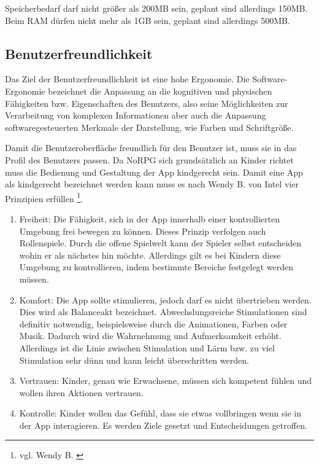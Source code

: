 		Speicherbedarf darf nicht größer als 200MB sein, geplant sind allerdings 150MB. Beim RAM dürfen nicht mehr als 1GB sein, geplant sind allerdings 500MB.
	
	\subsection{Benutzerfreundlichkeit}
		Das Ziel der Benutzerfreundlichkeit ist eine hohe Ergonomie. Die Software-Ergonomie bezeichnet die Anpassung an die kognitiven und physischen Fähigkeiten bzw. Eigenschaften des Benutzers, also seine Möglichkeiten zur Verarbeitung von komplexen Informationen aber auch die Anpassung softwaregesteuerten Merkmale der Darstellung, wie Farben und Schriftgröße.
		
		Damit die Benutzeroberfläche freundlich für den Benutzer ist, muss sie in das Profil des Benutzers passen. Da NoRPG sich grundsätzlich an Kinder richtet muss die Bedienung und Gestaltung der App kindgerecht sein. Damit eine App als kindgerecht bezeichnet werden kann muss es nach Wendy B. von Intel vier Prinzipien erfüllen \footnote{vgl. Wendy B. \cite{intelKids}}.
		
		\begin{enumerate}
			\item{Freiheit: Die Fähigkeit, sich in der App innerhalb einer kontrollierten Umgebung frei bewegen zu können. Dieses Prinzip verfolgen auch Rollenspiele. Durch die offene Spielwelt kann der Spieler selbst entscheiden wohin er als nächstes hin möchte. Allerdings gilt es bei Kindern diese Umgebung zu kontrollieren, indem bestimmte Bereiche festgelegt werden müssen.}
			\item{Komfort: Die App sollte stimulieren, jedoch darf es nicht übertrieben werden. Dies wird als Balanceakt bezeichnet. Abwechslungsreiche Stimulationen sind definitiv notwendig, beispielsweise durch die Animationen, Farben oder Musik. Dadurch wird die Wahrnehmung und Aufmerksamkeit erhöht. Allerdings ist die Linie zwischen Stimulation und Lärm bzw. zu viel Stimulation sehr dünn und kann leicht überschritten werden.}
			\item{Vertrauen: Kinder, genau wie Erwachsene, müssen sich kompetent fühlen und wollen ihren Aktionen vertrauen.}
			\item{Kontrolle: Kinder wollen das Gefühl, dass sie etwas vollbringen wenn sie in der App interagieren. Es werden Ziele gesetzt und Entscheidungen getroffen.}
		\end{enumerate}
	
